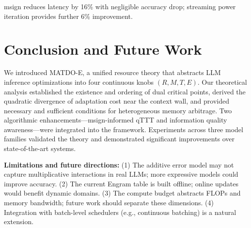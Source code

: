 \documentclass[11pt,a4paper]{article}
\theoremstyle{plain}
\theoremstyle{definition}
\begin{document}
msign reduces latency by 16\% with negligible accuracy drop; streaming power iteration provides further 6\% improvement.

\section{Conclusion and Future Work}
\label{sec:conclusion}

We introduced MATDO-E, a unified resource theory that abstracts LLM inference optimizations into four continuous knobs $(R,M,T,E)$. Our theoretical analysis established the existence and ordering of dual critical points, derived the quadratic divergence of adaptation cost near the context wall, and provided necessary and sufficient conditions for heterogeneous memory arbitrage. Two algorithmic enhancements---msign-informed qTTT and information quality awareness---were integrated into the framework. Experiments across three model families validated the theory and demonstrated significant improvements over state-of-the-art systems.

\textbf{Limitations and future directions:} (1) The additive error model may not capture multiplicative interactions in real LLMs; more expressive models could improve accuracy. (2) The current Engram table is built offline; online updates would benefit dynamic domains. (3) The compute budget abstracts FLOPs and memory bandwidth; future work should separate these dimensions. (4) Integration with batch-level schedulers (e.g., continuous batching) is a natural extension.
\end{document}
